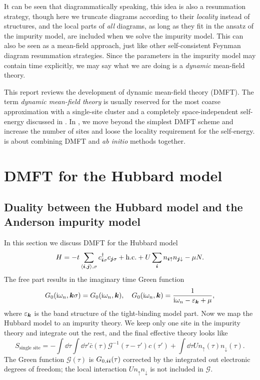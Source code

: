 \documentclass[hyperref, a4paper]{article}
\newcommand*{\ii}{\mathrm{i}}
\newcommand*{\pair}[1]{\langle #1 \rangle}
\begin{document}
It can be seen that diagrammatically speaking, 
this idea is also a resummation strategy,
though here we truncate diagrams according to their \emph{locality} instead of structures,
and the local parts of \emph{all} diagrams, 
as long as they fit in the ansatz of the impurity model,
are included when we solve the impurity model.
This can also be seen as a mean-field approach,
just like other self-consistent Feynman diagram resummation strategies.
Since the parameters in the impurity model may contain time explicitly,
we may say what we are doing is a \emph{dynamic} mean-field theory.

This report reviews the development of dynamic mean-field theory (DMFT).
The term \emph{dynamic mean-field theory} is usually reserved for 
the most coarse approximation with a single-site cluster
and a completely space-independent self-energy
discussed in .
In , we move beyond the simplest DMFT scheme 
and increase the number of sites 
and loose the locality requirement for the self-energy.
is about combining DMFT and \textit{ab initio} methods together.

\section{DMFT for the Hubbard model}\label{sec:dmft}

\subsection{Duality between the Hubbard model and the Anderson impurity model}

In this section we discuss DMFT for the Hubbard model
\begin{equation}
    H = - t \sum_{\pair{\vb*{i}, \vb*{j}}, \sigma} c^\dagger_{\vb*{i} \sigma} c_{\vb*{j} \sigma} + \text{h.c.}
    + U \sum_{\vb*{i}} n_{\vb*{i} \uparrow} n_{\vb*{j} \downarrow} - \mu N.
\end{equation}
The free part results in the imaginary time Green function
\begin{equation}
    G_{0}(\ii \omega_n, \vb*{k} \sigma) = G_0(\ii \omega_n, \vb*{k}) , 
    \quad G_0(\ii \omega_n, \vb*{k}) = \frac{1}{\ii \omega_n - \varepsilon_{\vb*{k}} + \mu},
\end{equation}
where $\varepsilon_{\vb*{k}}$ is the band structure of the tight-binding model part.
Now we map the Hubbard model to an impurity theory.
We keep only one site in the impurity theory
and integrate out the rest, 
and the final effective theory looks like
\begin{equation}
    S_{\text{single site}} = 
    - \int \dd{\tau} \int \dd{\tau'} \bar{c}(\tau) \mathcal{G}^{-1}(\tau - \tau') c(\tau') 
    + \int \dd{\tau} U n_{\uparrow}(\tau) n_{\downarrow}(\tau).
    \label{eq:single-site}
\end{equation}
The Green function $\mathcal{G}(\tau)$ is 
$G_{0, \vb*{i} \vb*{i}}(\tau)$ corrected by the integrated out electronic degrees of freedom;
the local interaction $U n_{\uparrow} n_{\downarrow}$ is not included in $\mathcal{G}$.
\end{document}
